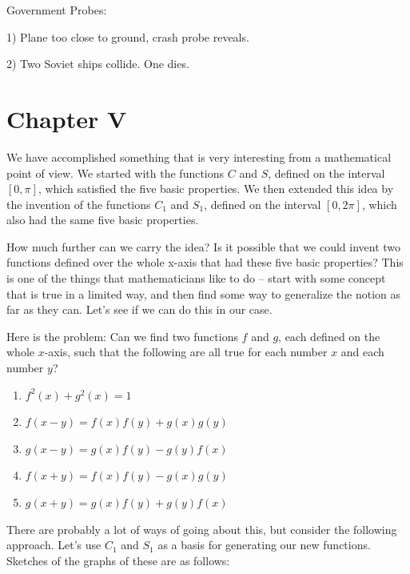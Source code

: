\documentclass[english]{book}
\begin{document}
\vspace{2cm}

\begin{center}
Government Probes:
\vspace{0.5cm}

1) Plane too close to ground, crash probe reveals.
\vspace{0.5cm}

2) Two Soviet ships collide. One dies.
\end{center}



\chapter*{Chapter V}


We have accomplished something that is very interesting from a mathematical point of view. We started with the functions $C$ and $S$, defined on the interval $[0,\pi]$, which satisfied the five basic properties. We then extended this idea by the invention of the functions $C_{1}$ and $S_{1}$, defined on the interval $[0,2\pi]$, which also had the same five basic properties. 

How much further can we carry the idea? Is it possible that we could invent two functions defined over the whole x-axis that had these five basic properties? This is one of the things that mathematicians like to do -- start with some concept that is true in a limited way, and then find some way to generalize the notion as far as they can. Let's see if we can do this in our case.

Here is the problem: Can we find two functions $f$ and $g$, each defined on the whole $x$-axis, such that the following are all true for each number $x$ and each number $y$?

\begin{enumerate}[\hspace{1cm}1)]
  \item $f^{2}(x)+g^{2}(x)=1$
  \item $f(x-y)=f(x)f(y)+g(x)g(y)$
  \item $g(x-y)=g(x)f(y)-g(y)f(x)$
  \item $f(x+y)=f(x)f(y)-g(x)g(y)$
  \item $g(x+y)=g(x)f(y)+g(y)f(x)$
\end{enumerate}

There are probably a lot of ways of going about this, but consider the following approach. Let's use $C_{1}$ and $S_{1}$ as a basis for generating our new functions. Sketches of the graphs of these are as follows:
\end{document}
